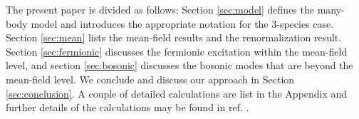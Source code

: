 \documentclass[reprint,pra]{revtex4-1}
\begin{document}
The present paper is divided as follows:
Section \ref{sec:model}  defines the many-body model and introduces the appropriate notation for the 3-species case. Section \ref{sec:mean} lists the mean-field results and the renormalization result. Section \ref{sec:fermionic} discusses the fermionic excitation within the mean-field level, and  section \ref{sec:bosonic} discusses the bosonic modes that are  beyond the mean-field level. We conclude and discuss our approach in Section \ref{sec:conclusion}.  A couple of detailed calculations are list in the Appendix and further details of the calculations may be found in ref. \cite{Zhuthesis}. 
\end{document}
